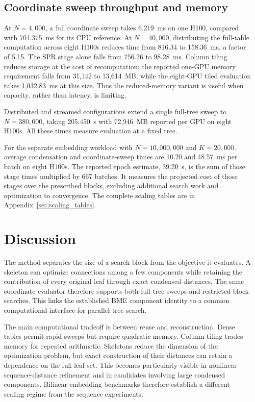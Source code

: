 \documentclass[11pt,a4paper]{article}
\makeatletter
\DeclareRobustCommand{\_}{\ifmmode\nfss@text{\textunderscore}\else\textunderscore\allowbreak\fi}
\theoremstyle{definition}
\makeatother
\begin{document}
\subsection{Coordinate sweep throughput and memory}

At $N=4{,}000$, a full coordinate sweep takes 6.219~ms on one H100, compared with 701.375~ms for its CPU reference.
At $N=40{,}000$, distributing the full-table computation across eight H100s reduces time from 816.34 to 158.36~ms, a factor of 5.15.
The SPR stage alone falls from 756.26 to 98.28~ms.
Column tiling reduces storage at the cost of recomputation: the reported one-GPU memory requirement falls from 31,142 to 13,614~MB, while the eight-GPU tiled evaluation takes 1,032.83~ms at this size.
Thus the reduced-memory variant is useful when capacity, rather than latency, is limiting.

Distributed and streamed configurations extend a single full-tree sweep to $N=380{,}000$, taking 205.450~s with 72,946~MB reported per GPU on eight H100s.
All these times measure evaluation at a fixed tree.

For the separate embedding workload with $N=10{,}000{,}000$ and $K=20{,}000$, average condensation and coordinate-sweep times are 10.20 and 48.57~ms per batch on eight H100s.
The reported epoch estimate, 39.20~s, is the sum of those stage times multiplied by 667 batches.
It measures the projected cost of those stages over the prescribed blocks, excluding additional search work and optimization to convergence.
The complete scaling tables are in Appendix~\ref{sec:scaling_tables}.

\section{Discussion}

The method separates the size of a search block from the objective it evaluates.
A skeleton can optimize connections among a few components while retaining the contribution of every original leaf through exact condensed distances.
The same coordinate evaluator therefore supports both full-tree sweeps and restricted block searches.
This links the established BME component identity to a common computational interface for parallel tree search.

The main computational tradeoff is between reuse and reconstruction.
Dense tables permit rapid sweeps but require quadratic memory.
Column tiling trades memory for repeated arithmetic.
Skeletons reduce the dimension of the optimization problem, but exact construction of their distances can retain a dependence on the full leaf set.
This becomes particularly visible in nonlinear sequence-distance refinement and in candidates involving large condensed components.
Bilinear embedding benchmarks therefore establish a different scaling regime from the sequence experiments.
\end{document}
